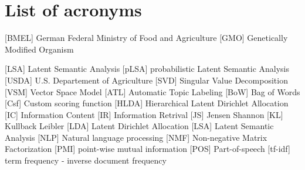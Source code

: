 \section*{List of acronyms}
\begin{acronym}
	\setlength{\parskip}{0ex}
	\setlength{\itemsep}{1ex}
	 [BMEL] {German Federal Ministry of Food and Agriculture}
	 [GMO] {Genetically Modified Organism}
	
		[LSA] {Latent Semantic Analysis}
	 [pLSA] {probabilistic Latent Semantic Analysis}
	 [USDA] {U.S. Departement of Agriculture}
	 [SVD] {Singular Value Decomposition}
	 [VSM] {Vector Space Model}	
	 [ATL] {Automatic Topic Labeling}
	 [BoW] {Bag of Words}
	 [Csf] {Custom scoring function}
	[HLDA] {Hierarchical Latent Dirichlet Allocation}
	 [IC] {Information Content}
		[IR] {Information Retrival}
	 [JS] {Jensen Shannon}
		[KL] {Kullback Leibler}
		[LDA] {Latent Dirichlet Allocation}
		[LSA]  {Latent Semantic Analysis}
	 [NLP] {Natural language processing}
	 	[NMF] {Non-negative Matrix Factorization}
	 [PMI] {point-wise mutual information}
	 [POS] {Part-of-speech}
	 [tf-idf] {term frequency - inverse document frequency}
	
\end{acronym}